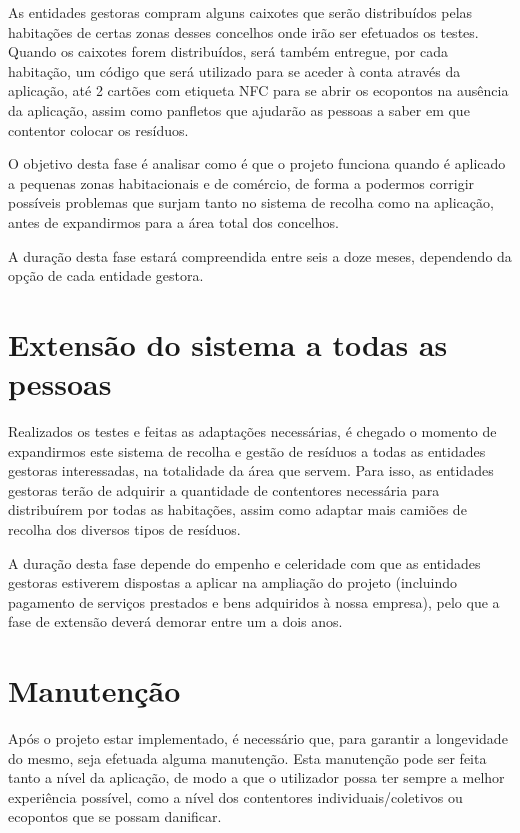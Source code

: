 \documentclass[11pt, a4paper, oneside]{book}
\begin{document}
As entidades gestoras compram alguns caixotes que serão distribuídos pelas habitações de certas zonas desses concelhos onde irão ser efetuados os testes. Quando os caixotes forem distribuídos, será também entregue, por cada habitação, um código que será utilizado para se aceder à conta através da aplicação, até 2 cartões com etiqueta NFC para se abrir os ecopontos na ausência da aplicação, assim como panfletos que ajudarão as pessoas a saber em que contentor colocar os resíduos.

O objetivo desta fase é analisar como é que o projeto funciona quando é aplicado a pequenas zonas habitacionais e de comércio, de forma a podermos corrigir possíveis problemas que surjam tanto no sistema de recolha como na aplicação, antes de expandirmos para a área total dos concelhos.

A duração desta fase estará compreendida entre seis a doze meses, dependendo da opção de cada entidade gestora.

\section{Extensão do sistema a todas as pessoas}

Realizados os testes e feitas as adaptações necessárias, é chegado o momento de expandirmos este sistema de recolha e gestão de resíduos a todas as entidades gestoras interessadas, na totalidade da área que servem. Para isso, as entidades gestoras terão de adquirir a quantidade de contentores necessária para distribuírem por todas as habitações, assim como adaptar mais camiões de recolha dos diversos tipos de resíduos.

A duração desta fase depende do empenho e celeridade com que as entidades gestoras estiverem dispostas a aplicar na ampliação do projeto (incluindo pagamento de serviços prestados e bens adquiridos à nossa empresa), pelo que a fase de extensão deverá demorar entre um a dois anos.

\section{Manutenção}

Após o projeto estar implementado, é necessário que, para garantir a longevidade do mesmo, seja efetuada alguma manutenção. Esta manutenção pode ser feita tanto a nível da aplicação, de modo a que o utilizador possa ter sempre a melhor experiência possível, como a nível dos contentores individuais/coletivos ou ecopontos que se possam danificar.
\end{document}
